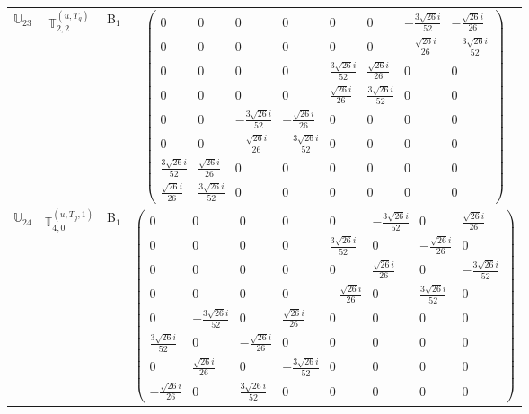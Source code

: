 \documentclass[fleqn,10pt,landscape]{article}
\begin{document}
\begin{itemize}
\begin{center}
\begin{longtable}{c|c|c|c}
$ \mathbb{U}_{23} $ & $\mathbb{T}_{2,2}^{(u,T_{g})}$ & B$_{1}$ & $\begin{pmatrix} 0 & 0 & 0 & 0 & 0 & 0 & - \frac{3 \sqrt{26} i}{52} & - \frac{\sqrt{26} i}{26} \\ 0 & 0 & 0 & 0 & 0 & 0 & - \frac{\sqrt{26} i}{26} & - \frac{3 \sqrt{26} i}{52} \\ 0 & 0 & 0 & 0 & \frac{3 \sqrt{26} i}{52} & \frac{\sqrt{26} i}{26} & 0 & 0 \\ 0 & 0 & 0 & 0 & \frac{\sqrt{26} i}{26} & \frac{3 \sqrt{26} i}{52} & 0 & 0 \\ 0 & 0 & - \frac{3 \sqrt{26} i}{52} & - \frac{\sqrt{26} i}{26} & 0 & 0 & 0 & 0 \\ 0 & 0 & - \frac{\sqrt{26} i}{26} & - \frac{3 \sqrt{26} i}{52} & 0 & 0 & 0 & 0 \\ \frac{3 \sqrt{26} i}{52} & \frac{\sqrt{26} i}{26} & 0 & 0 & 0 & 0 & 0 & 0 \\ \frac{\sqrt{26} i}{26} & \frac{3 \sqrt{26} i}{52} & 0 & 0 & 0 & 0 & 0 & 0 \end{pmatrix}$ \\
$ \mathbb{U}_{24} $ & $\mathbb{T}_{4,0}^{(u,T_{g},1)}$ & B$_{1}$ & $\begin{pmatrix} 0 & 0 & 0 & 0 & 0 & - \frac{3 \sqrt{26} i}{52} & 0 & \frac{\sqrt{26} i}{26} \\ 0 & 0 & 0 & 0 & \frac{3 \sqrt{26} i}{52} & 0 & - \frac{\sqrt{26} i}{26} & 0 \\ 0 & 0 & 0 & 0 & 0 & \frac{\sqrt{26} i}{26} & 0 & - \frac{3 \sqrt{26} i}{52} \\ 0 & 0 & 0 & 0 & - \frac{\sqrt{26} i}{26} & 0 & \frac{3 \sqrt{26} i}{52} & 0 \\ 0 & - \frac{3 \sqrt{26} i}{52} & 0 & \frac{\sqrt{26} i}{26} & 0 & 0 & 0 & 0 \\ \frac{3 \sqrt{26} i}{52} & 0 & - \frac{\sqrt{26} i}{26} & 0 & 0 & 0 & 0 & 0 \\ 0 & \frac{\sqrt{26} i}{26} & 0 & - \frac{3 \sqrt{26} i}{52} & 0 & 0 & 0 & 0 \\ - \frac{\sqrt{26} i}{26} & 0 & \frac{3 \sqrt{26} i}{52} & 0 & 0 & 0 & 0 & 0 \end{pmatrix}$ \\

\end{longtable}
\end{center}
\end{itemize}
\end{document}
